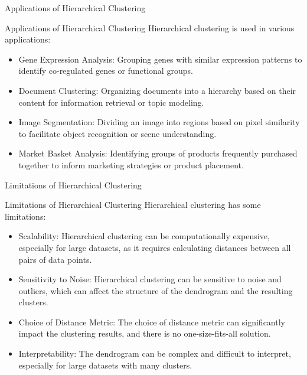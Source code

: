 \documentclass[hyperref={pdfpagelabels=false},aspectratio=169]{beamer}
\begin{document}
\begin{frame}[label={sec:orgf1bec32}]{Applications of Hierarchical Clustering}
\begin{block}{Applications of Hierarchical Clustering}
\pause
Hierarchical clustering is used in various applications:
\begin{itemize}[<+->]
\item \alert{\alert{Gene Expression Analysis}}: Grouping genes with similar expression patterns to identify co-regulated genes or functional groups.
\item \alert{\alert{Document Clustering}}: Organizing documents into a hierarchy based on their content for information retrieval or topic modeling.
\item \alert{\alert{Image Segmentation}}: Dividing an image into regions based on pixel similarity to facilitate object recognition or scene understanding.
\item \alert{\alert{Market Basket Analysis}}: Identifying groups of products frequently purchased together to inform marketing strategies or product placement.
\end{itemize}
\end{block}
\end{frame}
\begin{frame}[label={sec:org9fcfa6d}]{Limitations of Hierarchical Clustering}
\begin{block}{Limitations of Hierarchical Clustering}
\pause
Hierarchical clustering has some limitations:
\begin{itemize}[<+->]
\item \alert{\alert{Scalability}}: Hierarchical clustering can be computationally expensive, especially for large datasets, as it requires calculating distances between all pairs of data points.
\item \alert{\alert{Sensitivity to Noise}}: Hierarchical clustering can be sensitive to noise and outliers, which can affect the structure of the dendrogram and the resulting clusters.
\item \alert{\alert{Choice of Distance Metric}}: The choice of distance metric can significantly impact the clustering results, and there is no one-size-fits-all solution.
\item \alert{\alert{Interpretability}}: The dendrogram can be complex and difficult to interpret, especially for large datasets with many clusters.
\end{itemize}
\end{block}
\end{frame}
\end{document}

